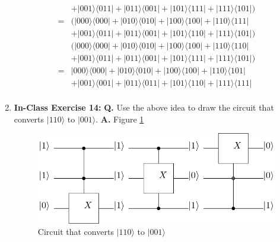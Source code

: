 \documentclass[main.tex]{subfiles}
\begin{document}
\begin{enumerate}
\begin{align*}
                                        & +|001\rangle\langle011|+|011\rangle\langle001|+|101\rangle\langle111|+|111\rangle\langle101|)\\
                                    =   & (|000\rangle\langle000|+|010\rangle\langle010|+|100\rangle\langle100|+|110\rangle\langle111|\\
                                        & +|001\rangle\langle011|+|011\rangle\langle001|+|101\rangle\langle110|+|111\rangle\langle101|)\\
                                        & (|000\rangle\langle000|+|010\rangle\langle010|+|100\rangle\langle100|+|110\rangle\langle110|\\
                                        & +|001\rangle\langle011|+|011\rangle\langle001|+|101\rangle\langle111|+|111\rangle\langle101|)\\
                                    =   & |000\rangle\langle000|+|010\rangle\langle010|+|100\rangle\langle100|+|110\rangle\langle101|\\
                                        & +|001\rangle\langle001|+|011\rangle\langle011|+|101\rangle\langle110|+|111\rangle\langle111|\\
    \end{align*}

\item[] \textbf{In-Class Exercise 14:} \textbf{Q.} Use the above idea to draw the circuit that converts $|110\rangle$ to $|001\rangle$. \textbf{A.} Figure \ref{fig:conversion}

    \begin{figure}
        \centering
        \includegraphics[width=5in]{modules/figs/m06/e14conversion.png}
        \caption{Circuit that converts $|110\rangle$ to $|001\rangle$}
        \label{fig:conversion}
    \end{figure}
    

\end{enumerate}
\end{document}
